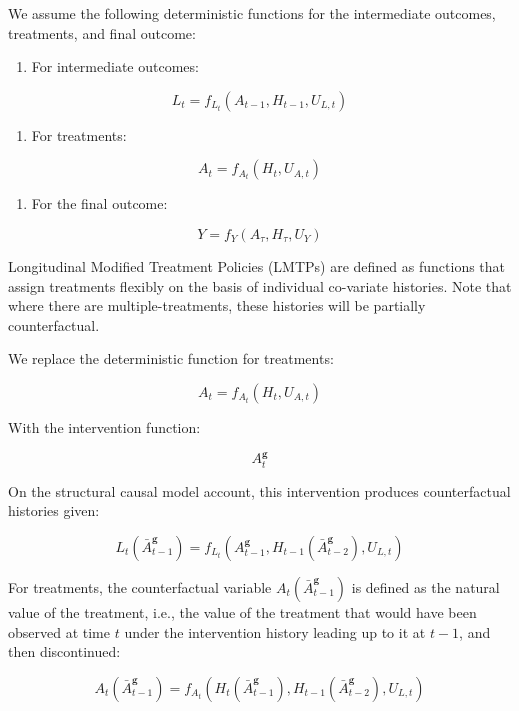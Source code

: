 \documentclass[
  single column]{article}
\providecommand{\tightlist}{%
  \setlength{\itemsep}{0pt}\setlength{\parskip}{0pt}}\usepackage{longtable,booktabs,array}
\begin{document}
We assume the following deterministic functions for the intermediate
outcomes, treatments, and final outcome:

\begin{enumerate}
\def\labelenumi{\arabic{enumi}.}
\tightlist
\item
  For intermediate outcomes:
\end{enumerate}

\[
L_t = f_{L_t}(A_{t-1}, H_{t-1}, U_{L,t})
\]

\begin{enumerate}
\def\labelenumi{\arabic{enumi}.}
\setcounter{enumi}{1}
\tightlist
\item
  For treatments:
\end{enumerate}

\[
A_t = f_{A_t}(H_t, U_{A,t})
\]

\begin{enumerate}
\def\labelenumi{\arabic{enumi}.}
\setcounter{enumi}{2}
\tightlist
\item
  For the final outcome:
\end{enumerate}

\[
Y = f_{Y}(A_{\tau}, H_{\tau}, U_{Y})
\]

Longitudinal Modified Treatment Policies (LMTPs) are defined as
functions that assign treatments flexibly on the basis of individual
co-variate histories. Note that where there are multiple-treatments,
these histories will be partially counterfactual.

We replace the deterministic function for treatments:

\[
A_t = f_{A_t}(H_t, U_{A,t})
\]

With the intervention function:

\[
A^\mathbf{g}_t
\]

On the structural causal model account, this intervention produces
counterfactual histories given:

\[
L_t(\bar{A}^\mathbf{g}_{t-1}) = f_{L_t}(A^\mathbf{g}_{t-1}, H_{t-1}(\bar{A}^\mathbf{g}_{t-2}), U_{L,t})
\]

For treatments, the counterfactual variable
\(A_t(\bar{A}^\mathbf{g}_{t-1})\) is defined as the natural value of the
treatment, i.e., the value of the treatment that would have been
observed at time \(t\) under the intervention history leading up to it
at \(t-1\), and then discontinued:

\[
A_t(\bar{A}^\mathbf{g}_{t-1}) = f_{A_t}(H_t(\bar{A}^\mathbf{g}_{t-1}), H_{t-1}(\bar{A}^\mathbf{g}_{t-2}), U_{L,t})
\]
\end{document}
